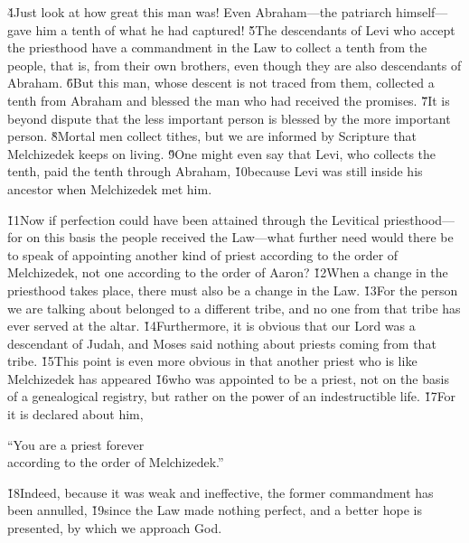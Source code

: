 \v{4}Just look at how great this man was! Even Abraham---the patriarch himself---gave him a tenth of what he had captured! \v{5}The descendants of Levi who accept the priesthood have a commandment in the Law to collect a tenth from the people, that is, from their own brothers, even though they are also descendants of Abraham. \v{6}But this man, whose descent is not traced from them, collected a tenth from Abraham and blessed the man who had received the promises. \v{7}It is beyond dispute that the less important person is blessed by the more important person. \v{8}Mortal men collect tithes, but we are informed by Scripture that Melchizedek keeps on living. \v{9}One might even say that Levi, who collects the tenth, paid the tenth through Abraham, \v{10}because Levi was still inside his ancestor when Melchizedek met him.

\v{11}Now if perfection could have been attained through the Levitical priesthood---for on this basis the people received the Law---what further need would there be to speak of appointing another kind of priest according to the order of Melchizedek, not one according to the order of Aaron? \v{12}When a change in the priesthood takes place, there must also be a change in the Law. \v{13}For the person we are talking about belonged to a different tribe, and no one from that tribe has ever served at the altar. \v{14}Furthermore, it is obvious that our Lord was a descendant of Judah, and Moses said nothing about priests coming from that tribe. \v{15}This point is even more obvious in that another priest who is like Melchizedek has appeared \v{16}who was appointed to be a priest, not on the basis of a genealogical registry, but rather on the power of an indestructible life. \v{17}For it is declared about him,

\begin{poetry}
\poeml ``You are a priest forever \\
\poemll    according to the order of Melchizedek.''
\end{poetry}

\v{18}Indeed, because it was weak and ineffective, the former commandment has been annulled, \v{19}since the Law made nothing perfect, and a better hope is presented, by which we approach God.

